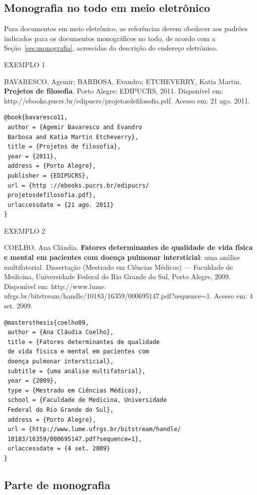 \subsection{Monografia no todo em meio eletrônico}

Para documentos em meio eletrônico, as referências devem obedecer aos padrões indicados para os documentos monográficos no todo, de acordo com a Seção~\ref{sec:monografia}, acrescidas da descrição do endereço eletrônico.

EXEMPLO 1 

BAVARESCO, Agemir; BARBOSA, Evandro; ETCHEVERRY, Katia Martin. \textbf{Projetos de filosofia}. Porto Alegre: EDIPUCRS, 2011. Disponível em: http://ebooks.pucrs.br/edipucrs/projetosdefilosofia.pdf. Acesso em: 21 ago. 2011.

\begin{verbatim}
@book{bavaresco11,
 author = {Agemir Bavaresco and Evandro 
 Barbosa and Katia Martin Etcheverry},
 title = {Projetos de filosofia},
 year = {2011},
 address = {Porto Alegre},
 publisher = {EDIPUCRS},
 url = {http ://ebooks.pucrs.br/edipucrs/
 projetosdefilosofia.pdf},
 urlaccessdate = {21 ago. 2011}
}
\end{verbatim}

EXEMPLO 2

COELHO, Ana Cláudia. \textbf{Fatores determinantes de qualidade de vida física e mental em pacientes com doença pulmonar intersticial}: uma análise multifatorial. Dissertação (Mestrado em Ciências Médicas) — Faculdade de Medicina, Universidade Federal do Rio Grande do Sul, Porto Alegre, 2009. Disponível em: http://www.lume. ufrgs.br/bitstream/handle/10183/16359/000695147.pdf?sequence=1. Acesso em: 4 set. 2009.

\begin{verbatim}
@mastersthesis{coelho09,
 author = {Ana Cláudia Coelho},
 title = {Fatores determinantes de qualidade 
 de vida física e mental em pacientes com 
 doença pulmonar intersticial},
 subtitle = {uma análise multifatorial},
 year = {2009},
 type = {Mestrado em Ciências Médicas},
 school = {Faculdade de Medicina, Universidade 
 Federal do Rio Grande do Sul},
 address = {Porto Alegre},
 url = {http://www.lume.ufrgs.br/bitstream/handle/
 10183/16359/000695147.pdf?sequence=1},
 urlaccessdate = {4 set. 2009}
}
\end{verbatim}

\subsection{Parte de monografia}

